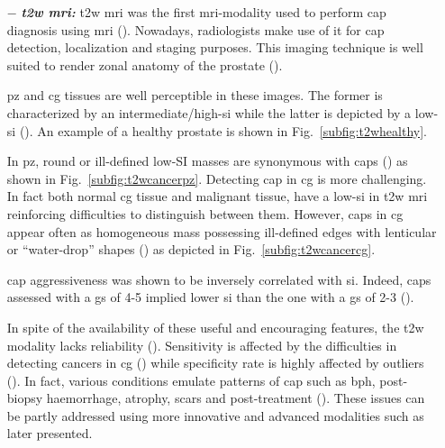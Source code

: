 \begin{enumerate}[leftmargin=*]

\item[$-$] \textbf{\textit{\ac{t2w} \ac{mri}:}} \ac{t2w} \ac{mri} was the first \ac{mri}-modality used to perform \ac{cap} diagnosis using \ac{mri} (\cite{Hricak1983}). Nowadays, radiologists make use of it for \ac{cap} detection, localization and staging purposes. This imaging technique is well suited to render zonal anatomy of the prostate (\cite{Barentsz2012}). 

\ac{pz} and \ac{cg} tissues are well perceptible in these images. The former is characterized by an intermediate/high-\ac{si} while the latter is depicted by a low-\ac{si} (\cite{Hricak1987}). An example of a healthy prostate is shown in Fig.~\ref{subfig:t2whealthy}.

In \ac{pz}, round or ill-defined low-SI masses are synonymous with \acp{cap} (\cite{Hricak1983}) as shown in Fig.~\ref{subfig:t2wcancerpz}. Detecting \ac{cap} in \ac{cg} is more challenging. In fact both normal \ac{cg} tissue and malignant tissue, have a low-\ac{si} in \ac{t2w} \ac{mri} reinforcing difficulties to distinguish between them. However, \acp{cap} in \ac{cg} appear often as homogeneous mass possessing ill-defined edges with lenticular or ``water-drop'' shapes (\cite{Akin2006, Barentsz2012}) as depicted in Fig.~\ref{subfig:t2wcancercg}. 

\ac{cap} aggressiveness was shown to be inversely correlated with \ac{si}. Indeed, \acp{cap} assessed with a \ac{gs} of 4-5 implied lower \ac{si} than the one with a \ac{gs} of 2-3 (\cite{Wang2008}).

In spite of the availability of these useful and encouraging features, the \ac{t2w} modality lacks reliability (\cite{Kirkham2006,Hoeks2011}). Sensitivity is affected by the difficulties in detecting cancers in \ac{cg} (\cite{Kirkham2006}) while specificity rate is highly affected by outliers (\cite{Barentsz2012}). In fact, various conditions emulate patterns of \ac{cap} such as \ac{bph}, post-biopsy haemorrhage, atrophy, scars and post-treatment (\cite{Hricak1987,Quint1991,Scheidler1999,Cruz2002,Barentsz2012}). These issues can be partly addressed using more innovative and advanced modalities such as later presented.


\end{enumerate}
